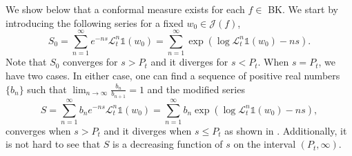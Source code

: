 \documentclass[12pt,reqno]{amsart}
\begin{document}
\noindent We show below that a conformal measure exists for each $f\in $ BK. We start by introducing the following series for a fixed $w_0 \in \mathcal{J}(f)$,
$$S_0=\sum_{n=1}^{\infty}e^{-ns}\mathcal{L}_t^n\mathbb{1}(w_0)=\sum_{n=1}^{\infty}\exp(\log \mathcal{L}_t^n\mathbb{1}(w_0) -ns).$$
Note that $S_0$ converges for $s>P_t$ and it diverges for $s<P_t$. When $s=P_t$, we have two cases. In either case, one can find a sequence of positive real numbers $\{b_n\}$ such that $\lim_{n\to \infty}\frac{b_{n}}{b_{n+ 1}}=1$ and the modified series
$$S=\sum_{n=1}^{\infty}b_ne^{-ns}\mathcal{L}_t^n\mathbb{1}(w_0)=\sum_{n=1}^{\infty}b_n\exp(\log \mathcal{L}_t^n\mathbb{1}(w_0) -ns),$$
converges when $s>P_t$ and it diverges when $s\leq P_t$ as shown in \citep[p. 356]{MeromorphicDynamics}. Additionally, it is not hard to see that $S$ is a decreasing function of $s$ on the interval $(P_t,\infty)$. 
\end{document}
